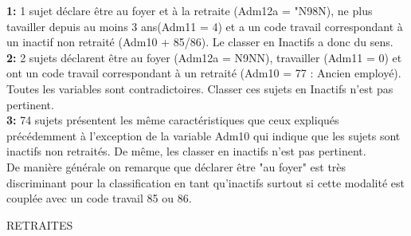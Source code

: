 \documentclass{book}
\begin{document}
\noindent
\textbf{1:} 1 sujet déclare être au foyer et à la retraite (Adm12a = "N98N), ne plus tavailler depuis au moins 3 ans(Adm11 = 4) et a un code travail correspondant à un inactif non retraité (Adm10 + 85/86). Le classer en Inactifs a donc du sens. \\
\noindent
\textbf{2:}  2 sujets déclarent être au foyer (Adm12a = N9NN), travailler (Adm11 = 0) et ont un code travail correspondant à un retraité (Adm10 = 77 : Ancien employé). Toutes les variables sont contradictoires. Classer ces sujets en Inactifs n'est pas pertinent.\\
\noindent
\textbf{3:} 74 sujets présentent les même caractéristiques que ceux expliqués précédemment à l'exception de la variable Adm10 qui indique que les sujets sont inactifs non retraités. De même, les classer en inactifs n'est pas pertinent.\\
\noindent
De manière générale on remarque que déclarer être "au foyer" est très discriminant pour la classification en tant qu'inactifs surtout si cette modalité est couplée avec un code travail 85 ou 86.\\


\begin{center} RETRAITES \end{center}
\end{document}
